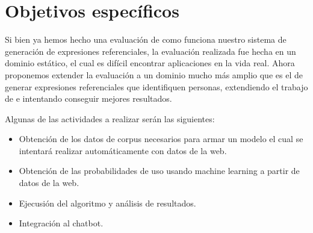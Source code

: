 \section{Objetivos espec\'ificos}
\label{objetivos}

Si bien ya hemos hecho una evaluaci\'on de como funciona nuestro sistema de generaci\'on de expresiones referenciales, la evaluaci\'on realizada 
fue hecha en un dominio est\'atico, el cual es dif\'icil encontrar aplicaciones en la vida real. Ahora proponemos
extender la evaluaci\'on a un dominio mucho m\'as amplio que es el de generar expresiones referenciales que identifiquen personas, extendiendo el
trabajo de \cite{PachecoDuboue} e intentando conseguir mejores resultados.



Algunas de las actividades a realizar ser\'an las siguientes:
\begin{itemize}

\item Obtenci\'on de los datos de corpus necesarios para armar un modelo el cual se intentar\'a realizar autom\'aticamente con datos de la web.
\item Obtenci\'on de las probabilidades de uso usando machine learning a partir de datos de la web.
\item Ejecusi\'on del algoritmo y an\'alisis de resultados.
\item Integraci\'on al chatbot.
\end{itemize}
